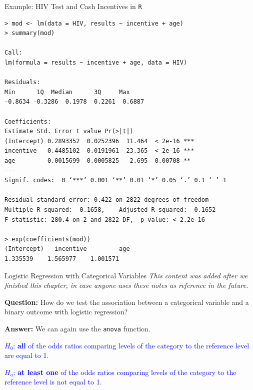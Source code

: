 \documentclass[10pt,t]{beamer}
\begin{document}
\begin{frame}[fragile]{Example: HIV Test and Cash Incentives in \texttt{R}}
	
	\vspace{-8 mm}
	
\scriptsize
\begin{verbatim}
> mod <- lm(data = HIV, results ~ incentive + age)
> summary(mod)

Call:
lm(formula = results ~ incentive + age, data = HIV)

Residuals:
Min      1Q  Median      3Q     Max 
-0.8634 -0.3286  0.1978  0.2261  0.6887 

Coefficients:
Estimate Std. Error t value Pr(>|t|)    
(Intercept) 0.2893352  0.0252396  11.464  < 2e-16 ***
incentive   0.4485102  0.0191961  23.365  < 2e-16 ***
age         0.0015699  0.0005825   2.695  0.00708 ** 
---
Signif. codes:  0 ‘***’ 0.001 ‘**’ 0.01 ‘*’ 0.05 ‘.’ 0.1 ‘ ’ 1

Residual standard error: 0.422 on 2822 degrees of freedom
Multiple R-squared:  0.1658,	Adjusted R-squared:  0.1652 
F-statistic: 280.4 on 2 and 2822 DF,  p-value: < 2.2e-16

> exp(coefficients(mod))
(Intercept)   incentive         age 
1.335539    1.565977    1.001571
\end{verbatim}
\end{frame}

\begin{frame}{Logistic Regression with Categorical Variables}
	\textit{This content was added after we finished this chapter, in case anyone uses these notes as reference in the future.}
	\bigskip
	
	\textbf{Question:} How do we test the association between a categorical variable and a binary outcome with logistic regression?
	
	\bigskip
	
	\textbf{Answer:} We can again use the \texttt{anova} function.
	
	\bigskip
	
	\textcolor{blue}{$H_0$: \textbf{all} of the odds ratios comparing levels of the category to the reference level are equal to 1.}
	
	\bigskip
	
		\textcolor{blue}{$H_a$: \textbf{at least one} of the odds ratios comparing levels of the category to the reference level is not equal to 1.}
\end{frame}
\end{document}
